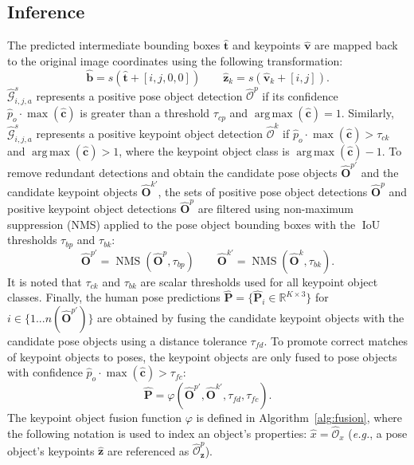 \documentclass[runningheads]{llncs}
\DeclareMathOperator*{\argmax}{arg\,max}
\DeclareMathOperator*{\iou}{IoU}
\DeclareMathOperator*{\nms}{NMS}
\newcommand{\eg}{\textit{e.g.}}
\newcommand\hlll[1]{\bgroup
  \hskip0pt\color{black}#1\egroup
}
\begin{document}
\subsection{Inference}
The predicted intermediate bounding boxes $\hat{\mathbf{t}}$ and keypoints $\hat{\mathbf{v}}$ are mapped back to the original image coordinates using the following transformation:
\begin{equation}
    \hat{\mathbf{b}} = s(\hat{\mathbf{t}} + [i, j, 0, 0]) \quad\quad \hat{\mathbf{z}}_k = s(\hat{\mathbf{v}}_k + [i, j]).
\end{equation}
$\hat{\mathcal{G}}^s_{i,j,a}$ represents a positive pose object detection $\hat{\mathcal{O}}^p$ if its confidence $\hat{p}_o\cdot\max(\hat{\mathbf{c}})$ is greater than a threshold $\tau_{cp}$ and $\argmax(\hat{\mathbf{c}})=1$. Similarly, $\hat{\mathcal{G}}^s_{i,j,a}$ represents a positive keypoint object detection $\hat{\mathcal{O}}^k$ if $\hat{p}_o\cdot\max(\hat{\mathbf{c}}) > \tau_{ck}$ and $\argmax(\hat{\mathbf{c}}) > 1$, where the keypoint object class is $\argmax(\hat{\mathbf{c}}) - 1$. To remove redundant detections and obtain the candidate pose objects $\hat{\mathbf{O}}^{p\prime}$ and the candidate keypoint objects $\hat{\mathbf{O}}^{k\prime}$, the sets of positive pose object detections $\hat{\mathbf{O}}^p$ and positive keypoint object detections $\hat{\mathbf{O}}^p$ are filtered using non-maximum suppression (NMS) applied to the pose object bounding boxes with the $\iou$ thresholds $\tau_{bp}$ and $\tau_{bk}$:
\begin{equation}
    \hat{\mathbf{O}}^{p\prime} = \nms(\hat{\mathbf{O}}^p, \tau_{bp}) \quad\quad \hat{\mathbf{O}}^{k\prime} = \nms(\hat{\mathbf{O}}^k, \tau_{bk}).
\end{equation}
\hlll{It is noted that $\tau_{ck}$ and $\tau_{bk}$ are scalar thresholds used for all keypoint object classes.} Finally, the human pose predictions $\hat{\mathbf{P}} = \{\hat{\mathbf{P}}_i\in\mathbb{R}^{K \times 3}\}$ for $i \in \{1...n(\hat{\mathbf{O}}^{p\prime})\}$ are obtained by fusing the candidate keypoint objects with the candidate pose objects using a distance tolerance $\tau_{fd}$. To promote correct matches of keypoint objects to poses, the keypoint objects are only fused to pose objects with confidence $\hat{p}_o\cdot\max(\hat{\mathbf{c}}) > \tau_{fc}$:
\begin{equation}
    \hat{\mathbf{P}} = \varphi(\hat{\mathbf{O}}^{p\prime}, \hat{\mathbf{O}}^{k\prime}, \tau_{fd}, \tau_{fc}).
\end{equation}
The keypoint object fusion function $\varphi$ is defined in Algorithm~\ref{alg:fusion}, where the following notation is used to index an object's properties: $\hat{x} = \hat{\mathcal{O}}_x$ (\eg, a pose object's keypoints $\hat{\mathbf{z}}$ are referenced as $\hat{\mathcal{O}}^{p}_{\mathbf{z}}$).
\end{document}
